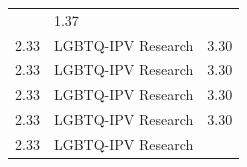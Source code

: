\documentclass[]{tufte-handout}
\begin{document}
\begin{longtable}[]{@{}lll@{}}
\begin{minipage}[t]{0.27\columnwidth}
\end{minipage} & \begin{minipage}[t]{0.08\columnwidth}\raggedright\strut
1.37\strut
\end{minipage}\tabularnewline
\begin{minipage}[t]{0.09\columnwidth}\raggedright\strut
2.33\strut
\end{minipage} & \begin{minipage}[t]{0.27\columnwidth}\raggedright\strut
LGBTQ-IPV Research\strut
\end{minipage} & \begin{minipage}[t]{0.08\columnwidth}\raggedright\strut
3.30\strut
\end{minipage}\tabularnewline
\begin{minipage}[t]{0.09\columnwidth}\raggedright\strut
2.33\strut
\end{minipage} & \begin{minipage}[t]{0.27\columnwidth}\raggedright\strut
LGBTQ-IPV Research\strut
\end{minipage} & \begin{minipage}[t]{0.08\columnwidth}\raggedright\strut
3.30\strut
\end{minipage}\tabularnewline
\begin{minipage}[t]{0.09\columnwidth}\raggedright\strut
2.33\strut
\end{minipage} & \begin{minipage}[t]{0.27\columnwidth}\raggedright\strut
LGBTQ-IPV Research\strut
\end{minipage} & \begin{minipage}[t]{0.08\columnwidth}\raggedright\strut
3.30\strut
\end{minipage}\tabularnewline
\begin{minipage}[t]{0.09\columnwidth}\raggedright\strut
2.33\strut
\end{minipage} & \begin{minipage}[t]{0.27\columnwidth}\raggedright\strut
LGBTQ-IPV Research\strut
\end{minipage} & \begin{minipage}[t]{0.08\columnwidth}\raggedright\strut
3.30\strut
\end{minipage}\tabularnewline
\begin{minipage}[t]{0.09\columnwidth}\raggedright\strut
2.33\strut
\end{minipage} & \begin{minipage}[t]{0.27\columnwidth}\raggedright\strut
LGBTQ-IPV Research\strut
\end{minipage} & \begin{minipage}[t]{0.08\columnwidth}\raggedright\strut

\end{minipage}
\end{longtable}
\end{document}
